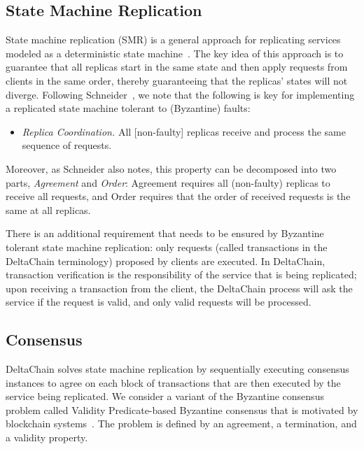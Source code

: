 \subsection{State Machine Replication}

State machine replication (SMR) is a general approach for replicating services
modeled as a deterministic state machine~\cite{Lam78:cacm,Sch90:survey}.  The
key idea of this approach is to guarantee that all replicas start in the same
state and then apply requests from clients in the same order, thereby
guaranteeing that the replicas' states will not diverge.  Following
Schneider~\cite{Sch90:survey}, we note that the following is key for
implementing a replicated state machine tolerant to (Byzantine) faults:

\begin{itemize} \item \emph{Replica Coordination.} All [non-faulty] replicas
    receive and process the same sequence of requests.  \end{itemize}

Moreover, as Schneider also notes, this property can be decomposed into two
parts, \emph{Agreement} and \emph{Order}: Agreement requires all (non-faulty)
replicas to receive all requests, and Order requires that the order of received
requests is the same at all replicas.

There is an additional requirement that needs to be ensured by Byzantine
tolerant state machine replication: only requests (called transactions in the
DeltaChain terminology) proposed by clients are executed. In DeltaChain,
transaction verification is the responsibility of the service that is being
replicated; upon receiving a transaction from the client, the DeltaChain
process will ask the service if the request is valid, and only valid requests
will be processed. 

 \subsection{Consensus} \label{sec:consensus}

DeltaChain solves state machine replication by sequentially executing consensus
instances to agree on each block of transactions that are
then executed by the service being replicated. We consider a variant of the
Byzantine consensus problem called Validity Predicate-based Byzantine consensus
that is motivated by blockchain systems~\cite{GLR17:red-belly-bc}. The problem
is defined by an agreement, a termination, and a validity property.

